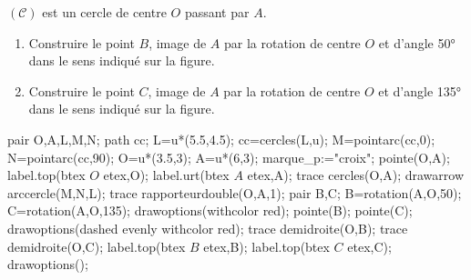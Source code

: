 \begin{corrige}
    $(\mathcal{C})$ est un cercle de centre $O$ passant par $A$.

    \begin{enumerate}
        \item Construire le point $B$, image de $A$ par la rotation de centre $O$ et d'angle \ang{50} dans le sens indiqué sur la figure.
        \item Construire le point $C$, image de $A$ par la rotation de centre $O$ et d'angle \ang{135} dans le sens indiqué sur la figure.
    \end{enumerate}
    \begin{center}
        \begin{Geometrie}[CoinHD={(7u,6u)}]
            pair O,A,L,M,N;
            path cc;
            L=u*(5.5,4.5);
            cc=cercles(L,u);
            M=pointarc(cc,0);
            N=pointarc(cc,90);
            O=u*(3.5,3);
            A=u*(6,3);
            marque_p:="croix";
            pointe(O,A);
            label.top(btex $O$ etex,O);
            label.urt(btex $A$ etex,A);
            trace cercles(O,A);
            drawarrow arccercle(M,N,L);
            trace rapporteurdouble(O,A,1);
            pair B,C;
            B=rotation(A,O,50);        
            C=rotation(A,O,135);
            drawoptions(withcolor red);
            pointe(B);
            pointe(C);
            drawoptions(dashed evenly withcolor red);
            trace demidroite(O,B);
            trace demidroite(O,C);
            label.top(btex $B$ etex,B);
            label.top(btex $C$ etex,C);
            drawoptions();
        \end{Geometrie}
    \end{center}
\end{corrige}

